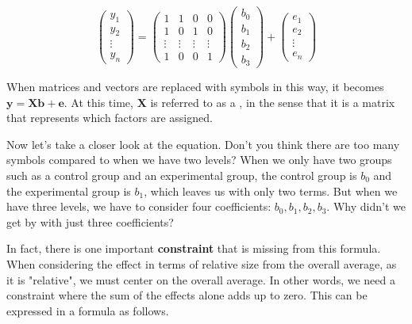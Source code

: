 \documentclass{ltjbook}
\begin{document}
\[
	\begin{pmatrix} y_1 \\ y_2 \\ \vdots \\ y_n \end{pmatrix}
	=
	\begin{pmatrix} 1 & 1 & 0 & 0 \\ 1 & 0 & 1 & 0 \\ \vdots  & \vdots & \vdots & \vdots \\ 1 & 0 & 0 & 1 \end{pmatrix}
	\begin{pmatrix} b_0 \\ b_1 \\ b_2 \\ b_3 \end{pmatrix}
	+
	\begin{pmatrix} e_1 \\ e_2 \\ \vdots \\ e_n \end{pmatrix}
\]

When matrices and vectors are replaced with symbols in this way, it becomes $\bm{y} = \bm{Xb} + \bm{e}$. At this time, $\bm{X}$ is referred to as a , in the sense that it is a matrix that represents which factors are assigned.



Now let's take a closer look at the equation. Don't you think there are too many symbols compared to when we have two levels? When we only have two groups such as a control group and an experimental group, the control group is $b_0$ and the experimental group is $b_1$, which leaves us with only two terms. But when we have three levels, we have to consider four coefficients: $b_0, b_1, b_2, b_3$. Why didn't we get by with just three coefficients?

In fact, there is one important \textbf{constraint} that is missing from this formula. When considering the effect in terms of relative size from the overall average, as it is "relative", we must center on the overall average. In other words, we need a constraint where the sum of the effects alone adds up to zero. This can be expressed in a formula as follows.
\end{document}
